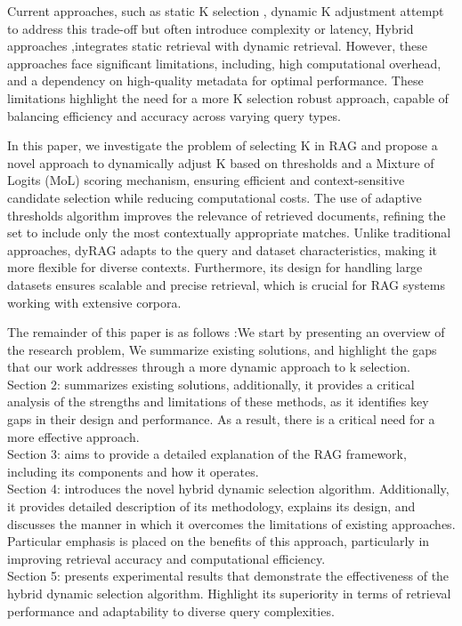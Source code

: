 \documentclass[review]{jair}
\begin{document}
Current approaches, such as static K selection \cite{lewis2020retrieval}, dynamic K adjustment attempt to address this trade-off but often introduce complexity or latency, Hybrid approaches \cite{yuan2024hybrid},integrates static retrieval with dynamic retrieval. However, these approaches face significant limitations, including, high computational overhead, and a dependency on high-quality metadata for optimal performance. These limitations highlight the need for a more K selection robust approach, capable of balancing efficiency and accuracy across varying query types.


In this paper, we investigate the problem of selecting K in RAG and propose a novel approach to dynamically adjust K based on  thresholds and a Mixture of Logits (MoL)\cite{ding2024efficient} scoring mechanism, ensuring efficient and context-sensitive candidate selection while reducing computational costs. The use of  adaptive thresholds algorithm improves the relevance of retrieved documents, refining the set to include only the most contextually appropriate matches. Unlike traditional approaches, dyRAG adapts to the query and dataset characteristics, making it more flexible for diverse contexts. Furthermore, its design for handling large datasets ensures scalable and precise retrieval, which is crucial for RAG systems working with extensive corpora.


The remainder of this paper is as follows :We start by presenting an overview of the research problem,  We summarize existing solutions, and highlight the gaps that our work addresses through a more dynamic approach to k selection.\\
Section 2: summarizes existing solutions, additionally, it provides a critical analysis of the strengths and limitations of these methods, as it identifies key gaps in their design and performance. As a result, there is a critical need for a more effective approach.\\
Section 3: aims to provide a detailed explanation of the RAG framework, including its components and how it operates.\\
Section 4: introduces the novel hybrid dynamic selection algorithm. Additionally, it provides detailed description of its methodology, explains its design, and discusses the manner in which it overcomes the limitations of existing  approaches. Particular emphasis is placed on the benefits of this approach, particularly in improving retrieval accuracy and computational efficiency.\\
Section 5: presents experimental results that demonstrate the effectiveness of the hybrid dynamic selection algorithm. Highlight its superiority in terms of retrieval performance and adaptability to diverse query complexities.
\end{document}
